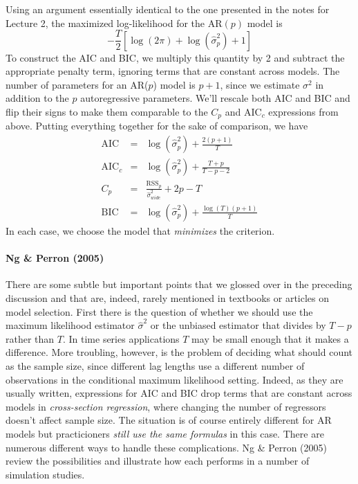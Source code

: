 Using an argument essentially identical to the one presented in the notes for Lecture 2, the maximized log-likelihood for the AR$(p)$ model is
	$$-\frac{T}{2}\left[\log(2\pi) + \log\left(\widehat{\sigma}^2_p \right) + 1\right]$$
To construct the AIC and BIC, we multiply this quantity by 2 and subtract the appropriate penalty term, ignoring terms that are constant across models. The number of parameters for an AR($p$) model is $p+1$, since we estimate $\sigma^2$ in addition to the $p$ autoregressive parameters. We'll rescale both AIC and BIC and flip their signs to make them comparable to the $C_p$ and AIC$_c$ expressions from above. Putting everything together for the sake of comparison, we have
\begin{eqnarray*}
	\mbox{AIC} &=& \log\left(\widehat{\sigma}^2_p \right) + \frac{2(p+1)}{T}\\
	\mbox{AIC}_c &=&  \log\left(\widehat{\sigma}^2_p \right) + \frac{T+p}{T-p-2}\\
	C_p &=&  \frac{\mbox{RSS}_p}{\widehat{\sigma}^2_{wide}} + 2p- T\\
	\mbox{BIC} &=&\log\left(\widehat{\sigma}^2_p \right) + \frac{ \log(T)(p+1)}{T}
\end{eqnarray*}
In each case, we choose the model that \emph{minimizes} the criterion. 


\paragraph{Ng \& Perron (2005)} There are some subtle but important points that we glossed over in the preceding discussion and that are, indeed, rarely mentioned in textbooks or articles on model selection. First there is the question of whether we should use the maximum likelihood estimator $\widehat{\sigma}^2$ or the unbiased estimator that divides by $T-p$ rather than $T$. In time series applications $T$ may be small enough that it makes a difference. More troubling, however, is the problem of deciding what should count as the sample size, since different lag lengths use a different number of observations in the conditional maximum likelihood setting. Indeed, as they are usually written, expressions for AIC and BIC drop terms that are constant across models in \emph{cross-section regression}, where changing the number of regressors doesn't affect sample size. The situation is of course entirely different for AR models but practicioners \emph{still use the same formulas} in this case. There are numerous different ways to handle these complications. Ng \& Perron (2005) review the possibilities and illustrate how each performs in a number of simulation studies.


